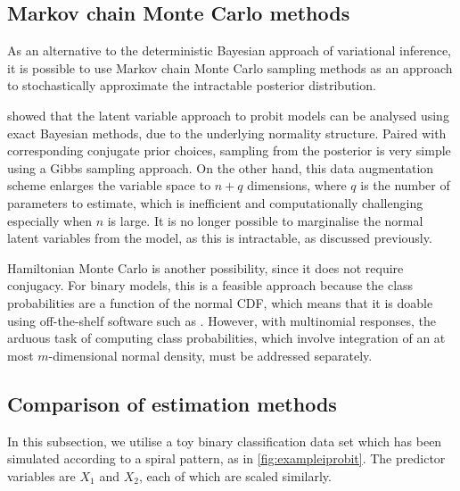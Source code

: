 \subsection{Markov chain Monte Carlo methods}

As an alternative to the deterministic Bayesian approach of variational inference, it is possible to use Markov chain Monte Carlo sampling methods as an approach to stochastically approximate the intractable posterior distribution.

\citet{albert1993bayesian} showed that the latent variable approach to probit models can be analysed using exact Bayesian methods, due to the underlying normality structure.
Paired with corresponding conjugate prior choices, sampling from the posterior is very simple using a Gibbs sampling approach.
On the other hand, this data augmentation scheme enlarges the variable space to $n+q$ dimensions, where $q$ is the number of parameters to estimate, which is inefficient and computationally challenging especially when $n$ is large.
It is no longer possible to marginalise the normal latent variables from the model, as this is intractable, as discussed previously.

Hamiltonian Monte Carlo is another possibility, since it does not require conjugacy.
For binary models, this is a feasible approach because the class probabilities are a function of the normal CDF, which means that it is doable using off-the-shelf software such as .
However, with multinomial responses, the arduous task of computing class probabilities, which involve integration of an at most $m$-dimensional normal density, must be addressed separately.


\subsection{Comparison of estimation methods}

In this subsection, we utilise a toy binary classification data set which has been simulated according to a spiral pattern, as in \cref{fig:exampleiprobit}.
The predictor variables are $X_1$ and $X_2$, each of which are scaled similarly.

